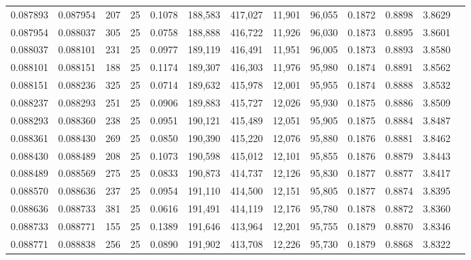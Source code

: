 \begin{tabular}{rrrrrrrrrrrrr}
0.087893 & 0.087954 &   207 &  25 &                                     0.1078 & 188,583 & 417,027 &  11,901 &  96,055 & 0.1872 & 0.8898 & 3.8629 \\
0.087954 & 0.088037 &   305 &  25 &                                     0.0758 & 188,888 & 416,722 &  11,926 &  96,030 & 0.1873 & 0.8895 & 3.8601 \\
0.088037 & 0.088101 &   231 &  25 &                                     0.0977 & 189,119 & 416,491 &  11,951 &  96,005 & 0.1873 & 0.8893 & 3.8580 \\
0.088101 & 0.088151 &   188 &  25 &                                     0.1174 & 189,307 & 416,303 &  11,976 &  95,980 & 0.1874 & 0.8891 & 3.8562 \\
0.088151 & 0.088236 &   325 &  25 &                                     0.0714 & 189,632 & 415,978 &  12,001 &  95,955 & 0.1874 & 0.8888 & 3.8532 \\
0.088237 & 0.088293 &   251 &  25 &                                     0.0906 & 189,883 & 415,727 &  12,026 &  95,930 & 0.1875 & 0.8886 & 3.8509 \\
0.088293 & 0.088360 &   238 &  25 &                                     0.0951 & 190,121 & 415,489 &  12,051 &  95,905 & 0.1875 & 0.8884 & 3.8487 \\
0.088361 & 0.088430 &   269 &  25 &                                     0.0850 & 190,390 & 415,220 &  12,076 &  95,880 & 0.1876 & 0.8881 & 3.8462 \\
0.088430 & 0.088489 &   208 &  25 &                                     0.1073 & 190,598 & 415,012 &  12,101 &  95,855 & 0.1876 & 0.8879 & 3.8443 \\
0.088489 & 0.088569 &   275 &  25 &                                     0.0833 & 190,873 & 414,737 &  12,126 &  95,830 & 0.1877 & 0.8877 & 3.8417 \\
0.088570 & 0.088636 &   237 &  25 &                                     0.0954 & 191,110 & 414,500 &  12,151 &  95,805 & 0.1877 & 0.8874 & 3.8395 \\
0.088636 & 0.088733 &   381 &  25 &                                     0.0616 & 191,491 & 414,119 &  12,176 &  95,780 & 0.1878 & 0.8872 & 3.8360 \\
0.088733 & 0.088771 &   155 &  25 &                                     0.1389 & 191,646 & 413,964 &  12,201 &  95,755 & 0.1879 & 0.8870 & 3.8346 \\
0.088771 & 0.088838 &   256 &  25 &                                     0.0890 & 191,902 & 413,708 &  12,226 &  95,730 & 0.1879 & 0.8868 & 3.8322 \\

\end{tabular}
